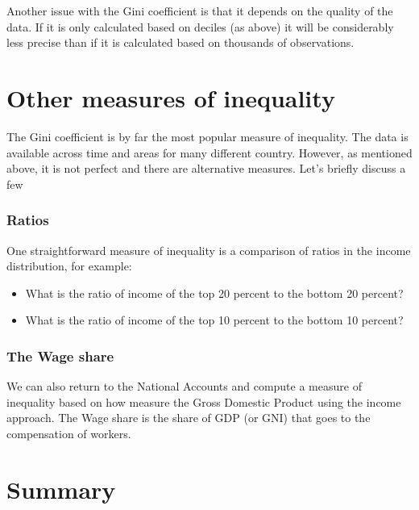 \documentclass[]{book}
\providecommand{\tightlist}{%
  \setlength{\itemsep}{0pt}\setlength{\parskip}{0pt}}
\begin{document}
Another issue with the Gini coefficient is that it depends on the quality of the data. If it is only calculated based on deciles (as above) it will be considerably less precise than if it is calculated based on thousands of observations.

\hypertarget{other-measures-of-inequality}{%
\section{Other measures of inequality}\label{other-measures-of-inequality}}

The Gini coefficient is by far the most popular measure of inequality. The data is available across time and areas for many different country. However, as mentioned above, it is not perfect and there are alternative measures. Let's briefly discuss a few

\hypertarget{ratios}{%
\subsubsection*{Ratios}\label{ratios}}

One straightforward measure of inequality is a comparison of ratios in the income distribution, for example:

\begin{itemize}
\tightlist
\item
  What is the ratio of income of the top 20 percent to the bottom 20 percent?
\item
  What is the ratio of income of the top 10 percent to the bottom 10 percent?
\end{itemize}

\hypertarget{the-wage-share}{%
\subsubsection*{The Wage share}\label{the-wage-share}}

We can also return to the National Accounts and compute a measure of inequality based on how measure the Gross Domestic Product using the income approach. The Wage share is the share of GDP (or GNI) that goes to the compensation of workers.

\hypertarget{summary-6}{%
\section{Summary}\label{summary-6}}
\end{document}
